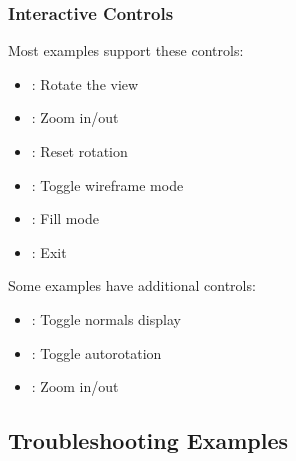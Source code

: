 \documentclass[a4paper,10pt,english,openany,oneside]{sphinxmanual}
\begin{document}
\subsubsection{Interactive Controls}
\label{\detokenize{examples:interactive-controls}}
\sphinxAtStartPar
Most examples support these controls:
\begin{itemize}
\item {} 
\sphinxAtStartPar
{}: Rotate the view

\item {} 
\sphinxAtStartPar
{}: Zoom in/out

\item {} 
\sphinxAtStartPar
{}: Reset rotation

\item {} 
\sphinxAtStartPar
{}: Toggle wireframe mode

\item {} 
\sphinxAtStartPar
{}: Fill mode

\item {} 
\sphinxAtStartPar
{}: Exit

\end{itemize}

\sphinxAtStartPar
Some examples have additional controls:
\begin{itemize}
\item {} 
\sphinxAtStartPar
{}: Toggle normals display

\item {} 
\sphinxAtStartPar
{}: Toggle auto\sphinxhyphen{}rotation

\item {} 
\sphinxAtStartPar
\sphinxstylestrong{+/\sphinxhyphen{}}: Zoom in/out

\end{itemize}


\subsection{Troubleshooting Examples}
\label{\detokenize{examples:troubleshooting-examples}}
\end{document}
